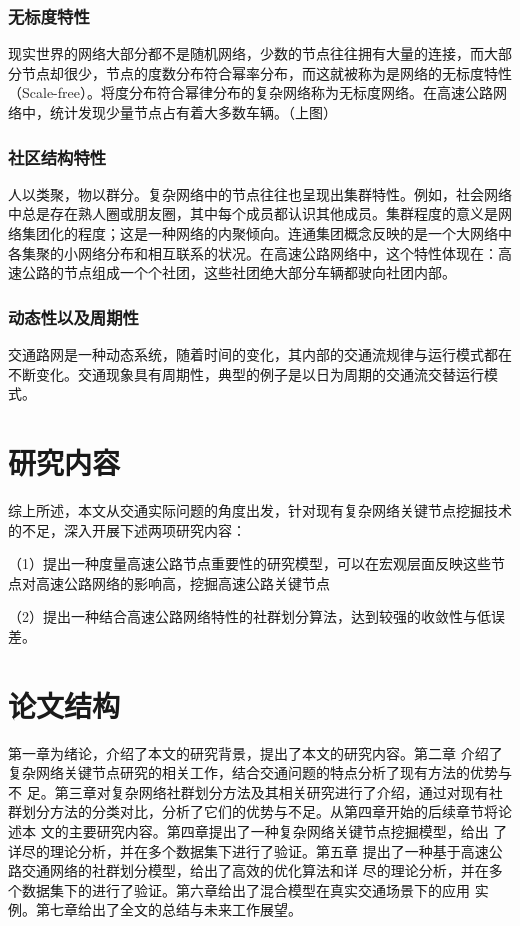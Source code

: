 \subsubsection{无标度特性}
				现实世界的网络大部分都不是随机网络，少数的节点往往拥有大量的连接，而大部分节点却很少，节点的度数分布符合幂率分布，而这就被称为是网络的无标度特性（Scale-free）。将度分布符合幂律分布的复杂网络称为无标度网络。在高速公路网络中，统计发现少量节点占有着大多数车辆。（上图）
\subsubsection{社区结构特性}
				人以类聚，物以群分。复杂网络中的节点往往也呈现出集群特性。例如，社会网络中总是存在熟人圈或朋友圈，其中每个成员都认识其他成员。集群程度的意义是网络集团化的程度；这是一种网络的内聚倾向。连通集团概念反映的是一个大网络中各集聚的小网络分布和相互联系的状况。在高速公路网络中，这个特性体现在：高速公路的节点组成一个个社团，这些社团绝大部分车辆都驶向社团内部。
\subsubsection{动态性以及周期性}
				交通路网是一种动态系统，随着时间的变化，其内部的交通流规律与运行模式都在不断变化。交通现象具有周期性，典型的例子是以日为周期的交通流交替运行模式。


\section{研究内容}
    综上所述，本文从交通实际问题的角度出发，针对现有复杂网络关键节点挖掘技术的不足，深入开展下述两项研究内容：
    
		（1）提出一种度量高速公路节点重要性的研究模型，可以在宏观层面反映这些节点对高速公路网络的影响高，挖掘高速公路关键节点
		
		（2）提出一种结合高速公路网络特性的社群划分算法，达到较强的收敛性与低误差。
		
\section{论文结构}
    第一章为绪论，介绍了本文的研究背景，提出了本文的研究内容。第二章
介绍了复杂网络关键节点研究的相关工作，结合交通问题的特点分析了现有方法的优势与不
足。第三章对复杂网络社群划分方法及其相关研究进行了介绍，通过对现有社群划分方法的分类对比，分析了它们的优势与不足。从第四章开始的后续章节将论述本
文的主要研究内容。第四章提出了一种复杂网络关键节点挖掘模型，给出
了详尽的理论分析，并在多个数据集下进行了验证。第五章
提出了一种基于高速公路交通网络的社群划分模型，给出了高效的优化算法和详
尽的理论分析，并在多个数据集下的进行了验证。第六章给出了混合模型在真实交通场景下的应用
实例。第七章给出了全文的总结与未来工作展望。